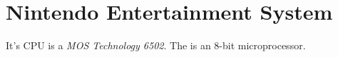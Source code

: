\chapter{Nintendo Entertainment System}

It's CPU is a \textit{MOS Technology 6502}.
The is an 8-bit microprocessor.
